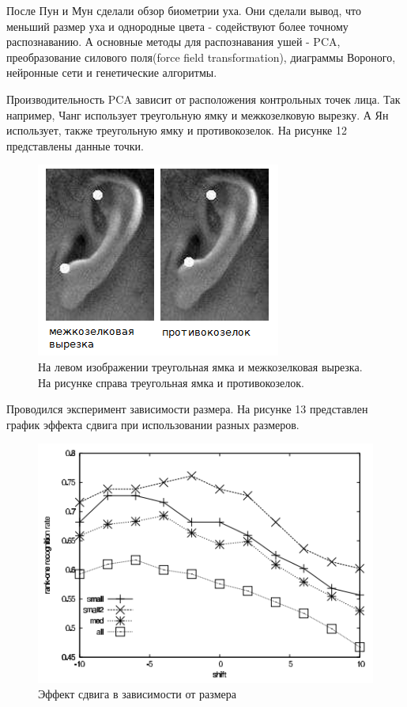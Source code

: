 \documentclass[12pt,a4paper]{article}					%
\begin{document}
После Пун и Мун сделали обзор биометрии уха.
Они сделали вывод, что меньший размер уха и однородные цвета - содействуют более точному распознаванию.
А основные методы для распознавания ушей - PCA, преобразование силового поля(force field transformation), диаграммы Вороного, нейронные сети и генетические алгоритмы.

Производительность PCA зависит от расположения контрольных точек лица.
Так например, Чанг использует треугольную ямку и межкозелковую вырезку.
А Ян использует, также треугольную ямку и противокозелок.
На рисунке 12 представлены данные точки.

\begin{figure}[h!]
\centering
\includegraphics[scale=0.70]{res/diff_ears}
\caption{На левом изображении треугольная ямка и межкозелковая вырезка. На рисунке справа треугольная ямка и противокозелок.}
\end{figure}

Проводился эксперимент зависимости размера. На рисунке 13 представлен график эффекта сдвига при использовании разных размеров.

\begin{figure}[h!]
\centering
\includegraphics[scale=0.70]{res/shift_eff}
\caption{Эффект сдвига в зависимости от размера}
\end{figure}
\end{document}
